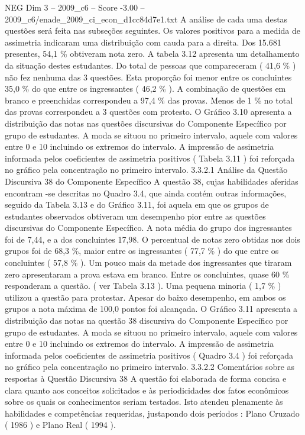 \begin{textsample}{NEG Dim 3 – 2009\_c6 – Score -3.00 – 2009\_c6/enade\_2009\_ci\_econ\_d1cc84d7e1.txt}
A análise de cada uma destas questões será feita nas subseções seguintes.
Os valores positivos para a medida de assimetria indicaram uma distribuição com cauda para a direita.
Dos 15.681 presentes, 54,1 \% obtiveram nota zero.
A tabela 3.12 apresenta um detalhamento da situação destes estudantes.
Do total de pessoas que compareceram ( 41,6 \% ) não fez nenhuma das 3 questões.
Esta proporção foi menor entre os concluintes 35,0 \% do que entre os ingressantes ( 46,2 \% ).
A combinação de questões em branco e preenchidas correspondeu a 97,4 \% das provas.
Menos de 1 \% no total das provas correspondeu a 3 questões com protesto.
O Gráfico 3.10 apresenta a distribuição das notas nas questões discursivas do Componente Específico por grupo de estudantes.
A moda se situou no primeiro intervalo, aquele com valores entre 0 e 10 incluindo os extremos do intervalo.
A impressão de assimetria informada pelos coeficientes de assimetria positivos ( Tabela 3.11 ) foi reforçada no gráfico pela concentração no primeiro intervalo. 3.3.2.1 Análise da Questão Discursiva 38 do Componente Específico A questão 38, cujas habilidades aferidas encontram -se descritas no Quadro 3.4, que ainda contém outras informações, seguido da Tabela 3.13 e do Gráfico 3.11, foi aquela em que os grupos de estudantes observados obtiveram um desempenho pior entre as questões discursivas do Componente Específico.
A nota média do grupo dos ingressantes foi de 7,44, e a dos concluintes 17,98.
O percentual de notas zero obtidas nos dois grupos foi de 68,3 \%, maior entre os ingressantes ( 77,7 \% ) do que entre os concluintes ( 57,8 \% ).
Um pouco mais da metade dos ingressantes que tiraram zero apresentaram a prova estava em branco.
Entre os concluintes, quase 60 \% responderam a questão. ( ver Tabela 3.13 ).
Uma pequena minoria ( 1,7 \% ) utilizou a questão para protestar.
Apesar do baixo desempenho, em ambos os grupos a nota máxima de 100,0 pontos foi alcançada.
O Gráfico 3.11 apresenta a distribuição das notas na questão 38 discursiva do Componente Específico por grupo de estudantes.
A moda se situou no primeiro intervalo, aquele com valores entre 0 e 10 incluindo os extremos do intervalo.
A impressão de assimetria informada pelos coeficientes de assimetria positivos ( Quadro 3.4 ) foi reforçada no gráfico pela concentração no primeiro intervalo. 3.3.2.2 Comentários sobre as respostas à Questão Discursiva 38 A questão foi elaborada de forma concisa e clara quanto aos conceitos solicitados e às periodicidades dos fatos econômicos sobre os quais os conhecimentos seriam testados.
Isto atendeu plenamente às habilidades e competências requeridas, justapondo dois períodos : Plano Cruzado ( 1986 ) e Plano Real ( 1994 ).

\end{textsample}
